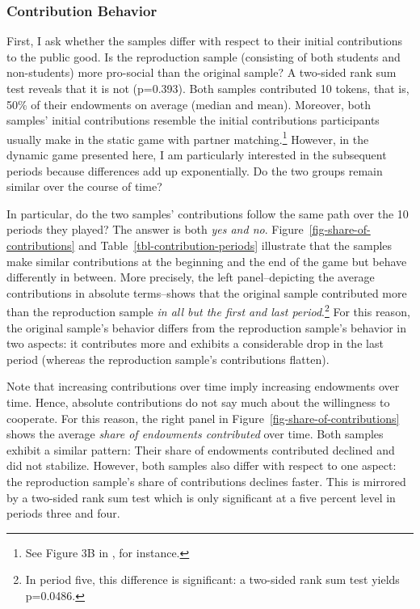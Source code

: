\documentclass[
  authoryear,
  review,
  3p,
  onecolumn]{elsarticle}
\begin{document}
\hypertarget{sec-contributions}{%
\subsubsection{Contribution Behavior}\label{sec-contributions}}

First, I ask whether the samples differ with respect to their initial
contributions to the public good. Is the reproduction sample (consisting
of both students and non-students) more pro-social than the original
sample? A two-sided rank sum test reveals that it is not (p=0.393). Both
samples contributed 10 tokens, that is, 50\% of their endowments on
average (median and mean). Moreover, both samples' initial contributions
resemble the initial contributions participants usually make in the
static game with partner matching.\footnote{See Figure 3B in
  \citet[p.989]{fehrgaechter2000}, for instance.} However, in the
dynamic game presented here, I am particularly interested in the
subsequent periods because differences add up exponentially. Do the two
groups remain similar over the course of time?

In particular, do the two samples' contributions follow the same path
over the 10 periods they played? The answer is both \emph{yes and no}.
Figure~\ref{fig-share-of-contributions} and
Table~\ref{tbl-contribution-periods} illustrate that the samples make
similar contributions at the beginning and the end of the game but
behave differently in between. More precisely, the left panel--depicting
the average contributions in absolute terms--shows that the original
sample contributed more than the reproduction sample \emph{in all but
the first and last period}.\footnote{In period five, this difference is
  significant: a two-sided rank sum test yields p=0.0486.} For this
reason, the original sample's behavior differs from the reproduction
sample's behavior in two aspects: it contributes more and exhibits a
considerable drop in the last period (whereas the reproduction sample's
contributions flatten).

Note that increasing contributions over time imply increasing endowments
over time. Hence, absolute contributions do not say much about the
willingness to cooperate. For this reason, the right panel in
Figure~\ref{fig-share-of-contributions} shows the average \emph{share of
endowments contributed} over time. Both samples exhibit a similar
pattern: Their share of endowments contributed declined and did not
stabilize. However, both samples also differ with respect to one aspect:
the reproduction sample's share of contributions declines faster. This
is mirrored by a two-sided rank sum test which is only significant at a
five percent level in periods three and four.
\end{document}
